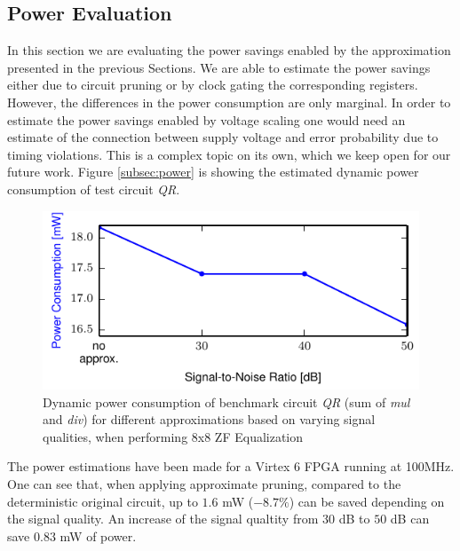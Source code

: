 \documentclass[conference]{IEEEtran}
\begin{document}
\subsection{Power Evaluation}
In this section we are evaluating the power savings enabled by the approximation presented in the previous Sections. We are able to estimate the power savings either due to circuit pruning or by clock gating the corresponding registers. However, the differences in the power consumption are only marginal. In order to estimate the power savings enabled by voltage scaling one would need an estimate of the connection between supply voltage and error probability due to timing violations. This is a complex topic on its own, which we keep open for our future work. Figure \ref{subsec:power} is showing the estimated dynamic power consumption of test circuit \emph{QR}. 
\label{subsec:power}
\begin{figure}[htb]
  \centering
  \includegraphics[width=.5\textwidth]{figs/power_qr}
  \caption{Dynamic power consumption of benchmark circuit \emph{QR} (sum of \emph{mul} and \emph{div}) for different approximations based on varying signal qualities, when performing 8x8 ZF Equalization}
  \label{fig:power_qr}
\end{figure}
The power estimations have been made for a Virtex 6 FPGA running at 100MHz. One can see that, when applying approximate pruning, compared to the deterministic original circuit, up to $1.6$ mW ($-8.7\%$) can be saved depending on the signal quality. An increase of the signal qualtity from $30$ dB to $50$ dB can save $0.83$ mW of power.
\end{document}
